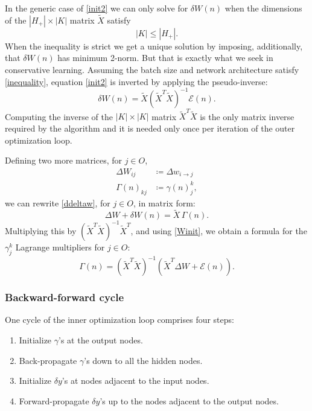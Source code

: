 \documentclass[12pt]{article}
\begin{document}
In the generic case of \eqref{init2} we can only solve for $\delta W(n)$ when the dimensions of the $|H_+|\times |K|$ matrix 
$\widetilde{X}$ satisfy
\begin{equation}\label{inequality}
|K|\le |H_+|.
\end{equation}
When the inequality is strict we get a unique solution by imposing, additionally, that $\delta W(n)$ has minimum 2-norm. But that is exactly what we seek in conservative learning. Assuming the batch size and network architecture satisfy \eqref{inequality}, equation \eqref{init2} is inverted by applying the pseudo-inverse:
\begin{equation}\label{Winit}
\delta W(n)=\widetilde{X}(\widetilde{X}^T \widetilde{X})^{-1}\mathcal{E}(n).
\end{equation}
Computing the inverse of the $|K|\times |K|$ matrix $\widetilde{X}^T \widetilde{X}$ is the only matrix inverse required by the algorithm and it is needed only once per iteration of the outer optimization loop.

Defining two more matrices, for $j\in O$,
\begin{align}
\Delta W_{i j}&\coloneqq\Delta w_{i\to j}\\
\Gamma(n)_{k j}&\coloneqq\gamma(n)^k_j,
\end{align}
we can rewrite \eqref{ddeltaw}, for $j\in O$, in matrix form:
\begin{equation}\label{W+dW}
\Delta W+\delta W(n)=\widetilde{X}\,\Gamma(n).
\end{equation}
Multiplying this by $(\widetilde{X}^T \widetilde{X})^{-1}\widetilde{X}^T$, and using \eqref{Winit}, we obtain a formula for the  $\gamma^k_j$ Lagrange multipliers for $j\in O$:
\begin{equation}\label{gammainit}
\Gamma(n)=(\widetilde{X}^T \widetilde{X})^{-1}\left(\widetilde{X}^T \Delta W+\mathcal{E}(n)\right).
\end{equation}

\subsubsection*{Backward-forward cycle}

One cycle of the inner optimization loop comprises four steps:
\begin{enumerate}
\item Initialize $\gamma$'s at the output nodes.
\item Back-propagate $\gamma$'s down to all the hidden nodes.
\item Initialize $\delta y$'s at nodes adjacent to the input nodes.
\item Forward-propagate $\delta y$'s up to the nodes adjacent to the output nodes.
\end{enumerate}
\end{document}
